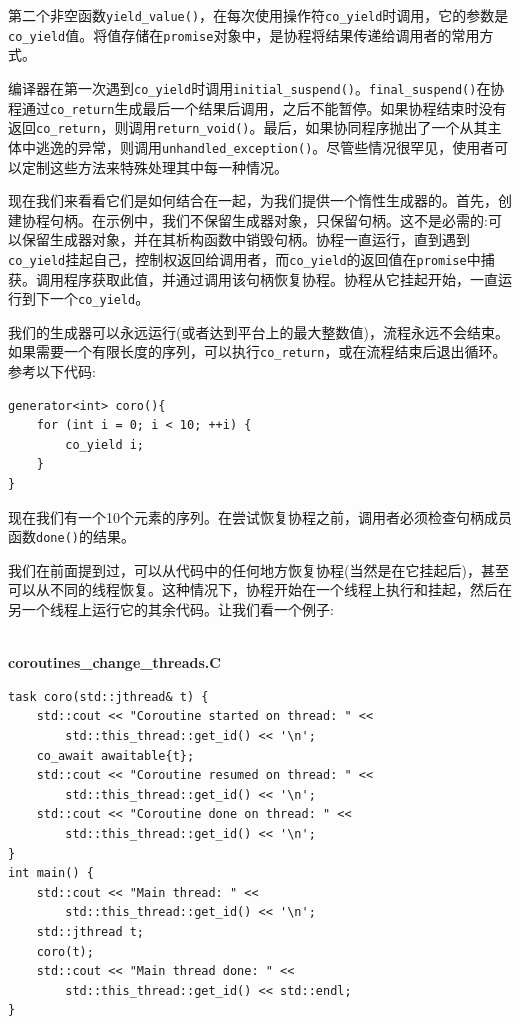 第二个非空函数\texttt{yield\_value()}，在每次使用操作符\texttt{co\_yield}时调用，它的参数是\texttt{co\_yield}值。将值存储在\texttt{promise}对象中，是协程将结果传递给调用者的常用方式。 

编译器在第一次遇到\texttt{co\_yield}时调用\texttt{initial\_suspend()}。\texttt{final\_suspend()}在协程通过\texttt{co\_return}生成最后一个结果后调用，之后不能暂停。如果协程结束时没有返回\texttt{co\_return}，则调用\texttt{return\_void()}。最后，如果协同程序抛出了一个从其主体中逃逸的异常，则调用\texttt{unhandled\_exception()}。尽管些情况很罕见，使用者可以定制这些方法来特殊处理其中每一种情况。

现在我们来看看它们是如何结合在一起，为我们提供一个惰性生成器的。首先，创建协程句柄。在示例中，我们不保留生成器对象，只保留句柄。这不是必需的:可以保留生成器对象，并在其析构函数中销毁句柄。协程一直运行，直到遇到\texttt{co\_yield}挂起自己，控制权返回给调用者，而\texttt{co\_yield}的返回值在\texttt{promise}中捕获。调用程序获取此值，并通过调用该句柄恢复协程。协程从它挂起开始，一直运行到下一个\texttt{co\_yield}。 

我们的生成器可以永远运行(或者达到平台上的最大整数值)，流程永远不会结束。如果需要一个有限长度的序列，可以执行\texttt{co\_return}，或在流程结束后退出循环。参考以下代码:

\begin{lstlisting}[style=styleCXX]
generator<int> coro(){
	for (int i = 0; i < 10; ++i) {
		co_yield i;
	}
}
\end{lstlisting}

现在我们有一个10个元素的序列。在尝试恢复协程之前，调用者必须检查句柄成员函数\texttt{done()}的结果。

我们在前面提到过，可以从代码中的任何地方恢复协程(当然是在它挂起后)，甚至可以从不同的线程恢复。这种情况下，协程开始在一个线程上执行和挂起，然后在另一个线程上运行它的其余代码。让我们看一个例子:

\hspace*{\fill} \\ %
\noindent
\textbf{coroutines\_change\_threads.C}
\begin{lstlisting}[style=styleCXX]
task coro(std::jthread& t) {
	std::cout << "Coroutine started on thread: " <<
		std::this_thread::get_id() << '\n';
	co_await awaitable{t};
    std::cout << "Coroutine resumed on thread: " <<
		std::this_thread::get_id() << '\n';
	std::cout << "Coroutine done on thread: " <<
		std::this_thread::get_id() << '\n';
}
int main() {
	std::cout << "Main thread: " <<
		std::this_thread::get_id() << '\n';
	std::jthread t;
	coro(t);
	std::cout << "Main thread done: " << 
		std::this_thread::get_id() << std::endl;
}
\end{lstlisting}

